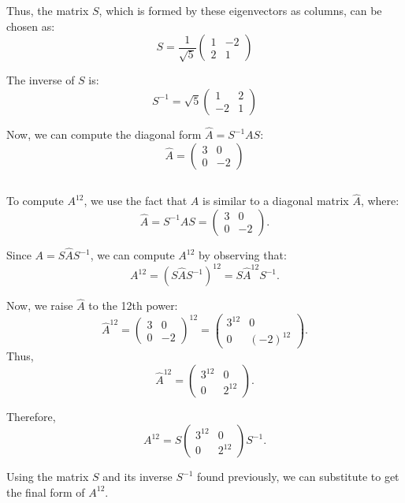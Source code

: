 \documentclass{article}
\begin{document}
Thus, the matrix \( S \), which is formed by these eigenvectors as columns, can be chosen as:
\[
    S = \frac{1}{\sqrt{5}} \begin{pmatrix} 1 & -2 \\ 2 & 1 \end{pmatrix}
\]

The inverse of \( S \) is:
\[
    S^{-1} = \sqrt{5} \begin{pmatrix} 1 & 2 \\ -2 & 1 \end{pmatrix}
\]

Now, we can compute the diagonal form \( \hat{A} = S^{-1} A S \):
\[
    \hat{A} = \begin{pmatrix} 3 & 0 \\ 0 & -2 \end{pmatrix}
\]
\subsection{}
To compute \( A^{12} \), we use the fact that \( A \) is similar to a diagonal matrix \( \hat{A} \), where:
\[
    \hat{A} = S^{-1} A S = \begin{pmatrix} 3 & 0 \\ 0 & -2 \end{pmatrix}.
\]

Since \( A = S \hat{A} S^{-1} \), we can compute \( A^{12} \) by observing that:
\[
    A^{12} = \left(S \hat{A} S^{-1}\right)^{12} = S \hat{A}^{12} S^{-1}.
\]

Now, we raise \( \hat{A} \) to the 12th power:
\[
    \hat{A}^{12} = \begin{pmatrix} 3 & 0 \\ 0 & -2 \end{pmatrix}^{12} = \begin{pmatrix} 3^{12} & 0 \\ 0 & (-2)^{12} \end{pmatrix}.
\]
Thus,
\[
    \hat{A}^{12} = \begin{pmatrix} 3^{12} & 0 \\ 0 & 2^{12} \end{pmatrix}.
\]

Therefore,
\[
    A^{12} = S \begin{pmatrix} 3^{12} & 0 \\ 0 & 2^{12} \end{pmatrix} S^{-1}.
\]

Using the matrix \( S \) and its inverse \( S^{-1} \) found previously, we can substitute to get the final form of \( A^{12} \).
\end{document}
